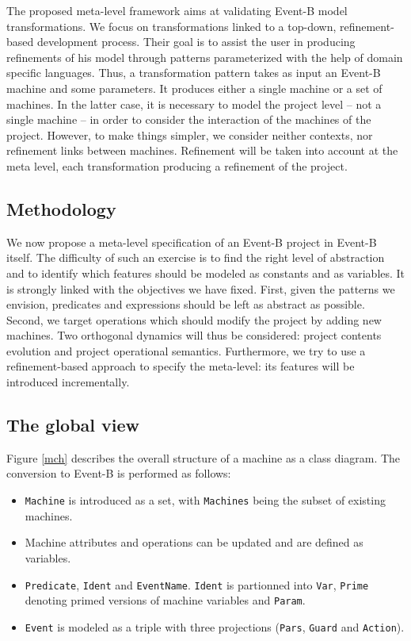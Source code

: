 \documentclass{llncs}
\begin{document}
The proposed meta-level framework aims at validating Event-B model
transformations. We focus on transformations linked to a top-down,
refinement-based development process. Their goal is to assist the user
in producing refinements of his model through patterns parameterized
with the help of domain specific languages. Thus, a transformation pattern takes
as input an Event-B machine and some parameters. It produces either a
single machine or a set of machines. In the latter case, it is
necessary to model the project level -- not a single machine -- in order to consider the
interaction of the machines of the project. However, to make things simpler, we 
consider neither contexts, nor refinement links between
machines. 
Refinement will be taken into account at the meta level, 
each transformation producing a refinement of the project.

    \subsection{Methodology}

    We now propose a meta-level specification of an Event-B project in
    Event-B itself. The difficulty of such an exercise is to find the
    right level of abstraction and to identify which features should be
    modeled as constants and as variables. It is strongly linked with
    the objectives we have fixed. First, given the patterns we
    envision, predicates and expressions should be left as abstract as
    possible. Second, we target operations which should modify the
    project by adding new machines. Two orthogonal dynamics will thus
    be considered: project contents evolution and project operational
    semantics.  Furthermore, we try to use a refinement-based approach
    to specify the meta-level: its features will be introduced
    incrementally.

    \subsection{The global view}
Figure \ref{mch} describes the overall structure of a machine as a
class diagram. The conversion to Event-B is performed as follows:

\begin{itemize}
  \item \texttt{Machine} is introduced as a set, with
    \texttt{Machines} being the subset of existing machines. 
  \item Machine attributes and operations can be updated and are
    defined as variables.
  \item \texttt{Predicate}, \texttt{Ident} and \texttt{EventName}. \texttt{Ident}
    is partionned into \texttt{Var}, \texttt{Prime} denoting primed
    versions of machine variables and \texttt{Param}.
  \item \texttt{Event} is modeled as a triple with three projections
    (\texttt{Pars}, \texttt{Guard} and \texttt{Action}). 
\end{itemize}
\end{document}
